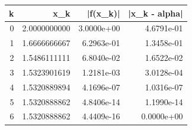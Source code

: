 \begin{tabular}{rrrr}
\toprule
k & x_k & |f(x_k)| & |x_k - alpha| \\
\midrule
0 & 2.0000000000 & 3.0000e+00 & 4.6791e-01 \\
1 & 1.6666666667 & 6.2963e-01 & 1.3458e-01 \\
2 & 1.5486111111 & 6.8040e-02 & 1.6522e-02 \\
3 & 1.5323901619 & 1.2181e-03 & 3.0128e-04 \\
4 & 1.5320889894 & 4.1696e-07 & 1.0316e-07 \\
5 & 1.5320888862 & 4.8406e-14 & 1.1990e-14 \\
6 & 1.5320888862 & 4.4409e-16 & 0.0000e+00 \\
\bottomrule
\end{tabular}
